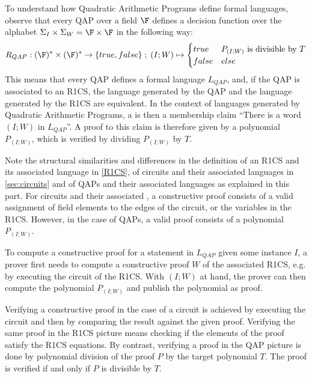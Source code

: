 To understand how Quadratic Arithmetic Programs define formal languages, observe that every QAP over a field $\F$ defines a decision function over the alphabet $\Sigma_I \times \Sigma_W = \F \times \F$ in the following way:
\begin{equation}
R_{QAP} : (\F)^* \times (\F)^* \to \{true, false\}\;;\;
(I;W) \mapsto
\begin{cases}
true & P_{(I;W)} \text{ is divisible by } T\\
false & else
\end{cases}
\end{equation}
This means that every QAP defines a formal language $L_{QAP}$, and, if the QAP is associated to an R1CS, the language generated by the QAP and the language generated by the R1CS are equivalent. In the context of languages generated by Quadratic Arithmetic Programs, a  is then a membership claim ``There is a word $(I;W)$ in $L_{QAP}$''. A proof to this claim is therefore given by a polynomial $P_{(I;W)}$, which is verified by dividing $P_{(I;W)}$ by $T$.

Note the structural similarities and differences in the definition of an R1CS and its associated language in \ref{R1CS}, of circuits and their associated languages in \ref{sec:circuits} and of QAPs and their associated languages as explained in this part. For circuits and their associated , a constructive proof consists of a valid assignment of field elements to the edges of the circuit, or the variables in the R1CS. However, in the case of QAPs, a valid proof consists of a polynomial $P_{(I;W)}$.

To compute a constructive proof for a statement in $L_{QAP}$ given some instance $I$, a prover first needs to compute a constructive proof $W$ of the associated R1CS, e.g. by executing the circuit of the R1CS. With $(I;W)$ at hand, the prover can then compute the polynomial $P_{(I;W)}$ and publish the polynomial as proof.

Verifying a constructive proof in the case of a circuit is achieved by executing the circuit and then by comparing the result against the given proof. Verifying the same proof in the R1CS picture means checking if the elements of the proof satisfy the R1CS equations. By contrast, verifying a proof in the QAP picture is done by polynomial division of the proof $P$ by the target polynomial $T$. The proof is verified if and only if $P$ is divisible by $T$.

